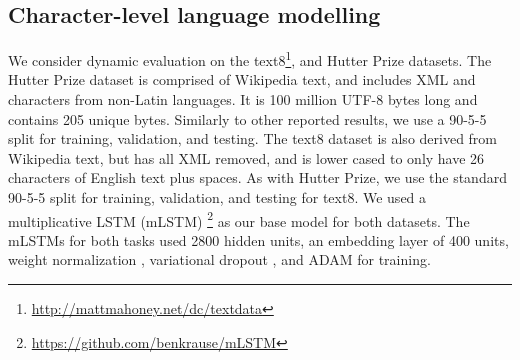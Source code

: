 \documentclass{article} %
\begin{document}
\subsection{Character-level language modelling}
\label{sec:char}
We consider dynamic evaluation on the text8\footnote{\url{http://mattmahoney.net/dc/textdata}}, and Hutter Prize \citep{Hutter-2006} datasets. The Hutter Prize dataset is comprised of Wikipedia text, and includes XML and characters from non-Latin languages. It is 100 million UTF-8 bytes long and contains 205 unique bytes. Similarly to other reported results, we use a 90-5-5 split for training, validation, and testing. The text8 dataset is also derived from Wikipedia text, but has all XML removed, and is lower cased to only have 26 characters of English text plus spaces. As with Hutter Prize, we use the standard 90-5-5 split for training, validation, and testing for text8. We used a multiplicative LSTM (mLSTM) \citep{krause2016}\footnote{\url{https://github.com/benkrause/mLSTM}} as our base model for both datasets. The mLSTMs for both tasks used 2800 hidden units, an embedding layer of 400 units, weight normalization \citep{salimans2016}, variational dropout \citep{gal2016}, and ADAM \citep{kingma2014} for training. 
\end{document}
